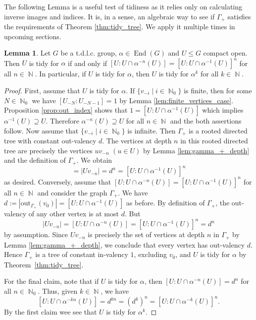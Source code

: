\documentclass{article}
\DeclareMathOperator\End{End}
\DeclareMathOperator\bbN{\mathbb{N}}
\theoremstyle{definition}
\newtheorem{lemma}[theorem]{Lemma}
\begin{document}
The following Lemma is a useful test of tidiness as it relies only on calculating inverse images and indices. It is, in a sense, an algebraic way to see if $\Gamma_{+}$ satisfies the requirements of Theorem \ref{thm:tidy_tree}. We apply it multiple times in upcoming sections.

\begin{lemma}\label{lem:tidy_powers}
Let $G$ be a t.d.l.c. group, $\alpha\in\End(G)$ and $U\le G$ compact open. Then $U$ is tidy for $\alpha$ if and only if $[U\!:\!U\!\cap\!\alpha^{-n}(U)]\!=\![U\!:\!U\!\cap\!\alpha^{-1}(U)]^{n}$ for all $n\!\in\!\bbN$. In particular, if $U$ is tidy for $\alpha$, then $U$ is tidy for $\alpha^k$ for all $k\in\bbN$.
\end{lemma}

\begin{proof}
First, assume that $U$ is tidy for $\alpha$. If $\{v_{-i}\mid i\in\bbN_{0}\}$ is finite, then for some $N\in\bbN_{0}$ we have $[U_{-N}: U_{-N-1}] = 1$ by Lemma \ref{lem:finite_vertices_case}. Proposition \ref{prop:out_index} shows that $1=[U:U\cap\alpha^{-1}(U)]$ which implies $\alpha^{-1}(U)\supseteq U$. Therefore $\alpha^{-n}(U)\supseteq U$ for all $n\in\bbN$ and the both assertions follow. Now assume that $\{v_{-i}\mid i\in\bbN_{0}\}$ is infinite. Then $\Gamma_{+}$ is a rooted directed tree with constant out-valency $d$. The vertices at depth $n$ in this rooted directed tree are precisely the vertices $uv_{-n}$ $(u\in U)$ by Lemma \ref{lem:gamma_+_depth} and the definition of $\Gamma_{+}$. We obtain
\begin{displaymath}
  [U:U\cap\alpha^{-n}(U)]=|Uv_{-n}|=d^{n}=[U:U\cap\alpha^{-1}(U)]^{n}
\end{displaymath}
as desired. Conversely, assume that $[U:U\cap\alpha^{-n}(U)]=[U:U\cap\alpha^{-1}(U)]^{n}$ for all $n\in\bbN$ and consider the graph $\Gamma_{+}$. We have $d:=|\mathrm{out}_{\Gamma_{+}}(v_{0})|=[U:U\cap\alpha^{-1}(U)]$ as before. By definition of $\Gamma_{+}$, the out-valency of any other vertex is at most $d$. But
\begin{displaymath}
  |Uv_{-n}|=[U:U\cap\alpha^{-n}(U)]=[U:U\cap\alpha^{-1}(U)]^{n}=d^{n}
\end{displaymath}
by assumption. Since $Uv_{-n}$ is precisely the set of vertices at depth $n$ in $\Gamma_{+}$ by Lemma \ref{lem:gamma_+_depth}, we conclude that every vertex has out-valency $d$. Hence $\Gamma_{+}$ is a tree of constant in-valency $1$, excluding $v_{0}$, and $U$ is tidy for $\alpha$ by Theorem~\ref{thm:tidy_tree}.

For the final claim, note that if $U$ is tidy for $\alpha$, then $[U:U\cap \alpha^{-n}(U)] = d^n$ for all $n\in\bbN_{0}$. Thus, given $k\in\bbN$, we have
\[[U:U\cap \alpha^{-kn}(U)] = d^{kn} = (d^k)^n = [U:U\cap \alpha^{-k}(U)]^n.\] 
By the first claim wee see that $U$ is tidy for $\alpha^k$.
\end{proof}
\end{document}
